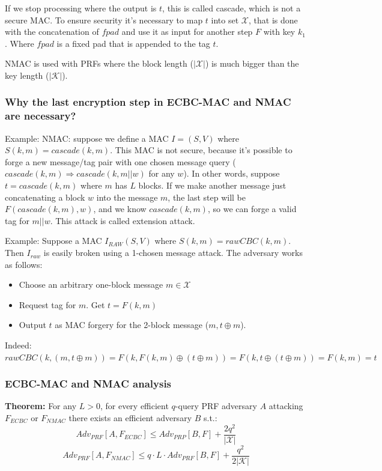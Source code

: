 \documentclass[12pt]{book}
\newcommand{\Thm}{\textbf{Theorem:} }
\begin{document}
If we stop processing where the output is $t$, this is called cascade, which is not a secure MAC. To ensure security it's necessary to map $t$ into set $\mathcal{X}$, that is done with the concatenation of $fpad$ and use it as input for another step $F$ with key $k_{1}$. Where $fpad$ is a fixed pad that is appended to the tag $t$.

NMAC is used with PRFs where the block length ($|\mathcal{X}|$) is much bigger than the key length ($|\mathcal{K}|$).

\subsubsection{Why the last encryption step in ECBC-MAC and NMAC are necessary?}
Example: NMAC: suppose we define a MAC $I=(S,V)$ where $S(k,m)=cascade(k,m)$. This MAC is not secure, because it's possible to forge a new message/tag pair with one chosen message query ($cascade(k,m)\Rightarrow cascade(k,m||w)$ for any $w$). In other words, suppose $t=cascade(k,m)$ where $m$ has $L$ blocks. If we make another message just concatenating a block $w$ into the message $m$, the last step will be $F(cascade(k,m),w)$, and we know $cascade(k,m)$, so we can forge a valid tag for $m||w$. This attack is called extension attack.

Example: Suppose a MAC $I_{RAW}(S,V)$ where $S(k,m)=rawCBC(k,m)$. Then $I_{raw}$ is easily broken using a 1-chosen message attack. The adversary works as follows:
\begin{itemize}
	\item Choose an arbitrary one-block message $m\in\mathcal{X}$
	\item Request tag for $m$. Get $t=F(k,m)$
	\item Output $t$ as MAC forgery for the 2-block message ($m,t\oplus m$).
\end{itemize}Indeed: $rawCBC(k,(m,t\oplus m))=F(k,F(k,m)\oplus (t\oplus m))=F(k,t\oplus (t\oplus m))=F(k,m)=t$

\subsubsection{ECBC-MAC and NMAC analysis}
\Thm For any $L>0$, for every efficient $q$-query PRF adversary $A$ attacking $F_{ECBC}$ or $F_{NMAC}$ there exists an efficient adversary $B$ s.t.:
$$Adv_{PRF}[A,F_{ECBC}]\leq Adv_{PRP}[B,F]+\frac{2q^{2}}{|\mathcal{X}|}$$
$$Adv_{PRF}[A,F_{NMAC}]\leq q\cdot L\cdot Adv_{PRF}[B,F]+\frac{q^{2}}{2|\mathcal{K}|}$$
\end{document}
